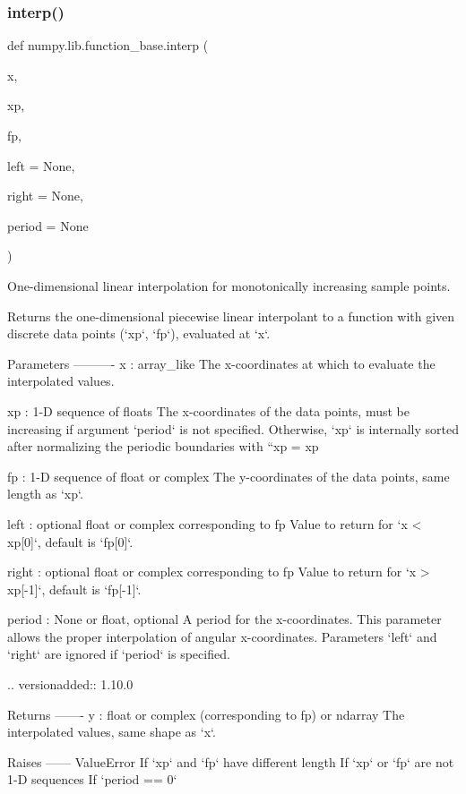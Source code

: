 \subsubsection{\texorpdfstring{interp()}{interp()}}
{\footnotesize\ttfamily def numpy.\+lib.\+function\+\_\+base.\+interp (\begin{DoxyParamCaption}\item[{}]{x,  }\item[{}]{xp,  }\item[{}]{fp,  }\item[{}]{left = {\ttfamily None},  }\item[{}]{right = {\ttfamily None},  }\item[{}]{period = {\ttfamily None} }\end{DoxyParamCaption})}

\begin{DoxyVerb}One-dimensional linear interpolation for monotonically increasing sample points.

Returns the one-dimensional piecewise linear interpolant to a function
with given discrete data points (`xp`, `fp`), evaluated at `x`.

Parameters
----------
x : array_like
    The x-coordinates at which to evaluate the interpolated values.

xp : 1-D sequence of floats
    The x-coordinates of the data points, must be increasing if argument
    `period` is not specified. Otherwise, `xp` is internally sorted after
    normalizing the periodic boundaries with ``xp = xp %

fp : 1-D sequence of float or complex
    The y-coordinates of the data points, same length as `xp`.

left : optional float or complex corresponding to fp
    Value to return for `x < xp[0]`, default is `fp[0]`.

right : optional float or complex corresponding to fp
    Value to return for `x > xp[-1]`, default is `fp[-1]`.

period : None or float, optional
    A period for the x-coordinates. This parameter allows the proper
    interpolation of angular x-coordinates. Parameters `left` and `right`
    are ignored if `period` is specified.

    .. versionadded:: 1.10.0

Returns
-------
y : float or complex (corresponding to fp) or ndarray
    The interpolated values, same shape as `x`.

Raises
------
ValueError
    If `xp` and `fp` have different length
    If `xp` or `fp` are not 1-D sequences
    If `period == 0`


\end{DoxyVerb}
